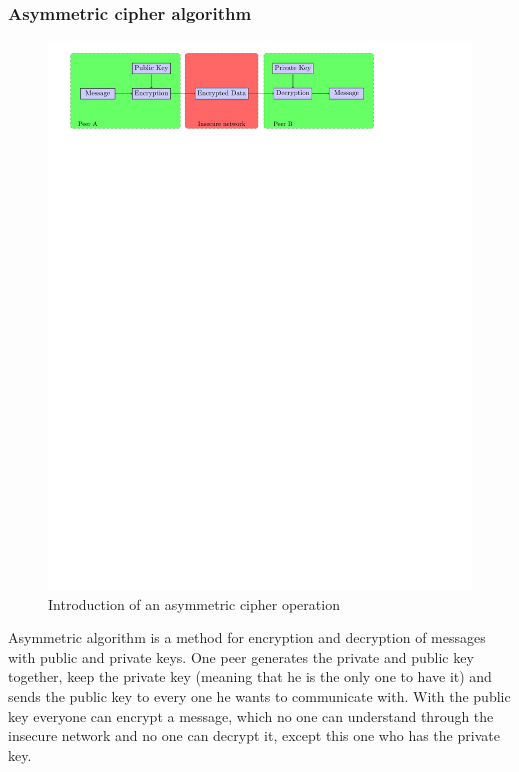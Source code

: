\newpage
\subsubsection{Asymmetric cipher algorithm}
\label{intro_asym_cipher}

\begin{figure}[!ht]
\centering
\includegraphics[trim=1cm 23.25cm 4cm 0cm]{figures/asym_cipher.pdf}
\caption{Introduction of an asymmetric cipher operation}
\label{fig:asym}
\end{figure}
Asymmetric algorithm is a method for encryption and decryption of messages with
public and private keys. \newline
One peer generates the private and public key together, keep the private key
(meaning that he is the only one to have it) and sends the public key to every
one he wants to communicate with.\newline
With the public key everyone can encrypt a message, which no one can understand
through the insecure network and no one can decrypt it, except this one who has
the private key.\newline

